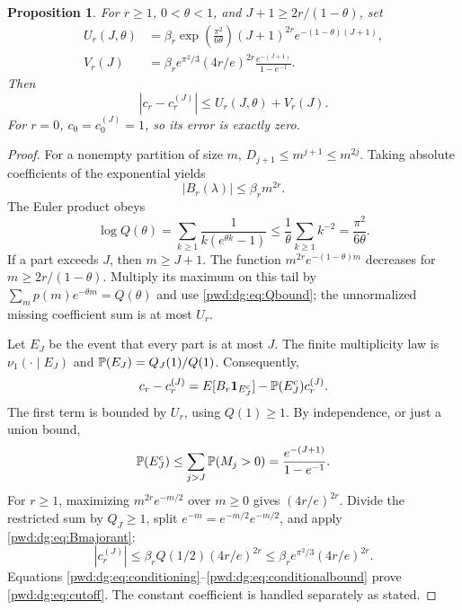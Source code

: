 \documentclass[11pt,letterpaper]{article}
\numberwithin{equation}{section}
\newtheorem{proposition}[theorem]{Proposition}
\theoremstyle{remark}\newtheorem{remark}[theorem]{Remark}
\newcommand{\ind}{\mathbf 1}
\begin{document}
\begin{proposition}\label{pwd:dg:prop:cutoff}
For $r\ge1$, $0<\theta<1$, and $J+1\ge2r/(1-\theta)$, set
\begin{align}
 U_r(J,\theta)&=\beta_r\exp\left(\frac{\pi^2}{6\theta}\right)
 (J+1)^{2r}e^{-(1-\theta)(J+1)},\label{pwd:dg:eq:U}\\
 V_r(J)&=\beta_r e^{\pi^2/3}(4r/e)^{2r}
             \frac{e^{-(J+1)}}{1-e^{-1}}.\label{pwd:dg:eq:V}
\end{align}
Then
\begin{equation}\label{pwd:dg:eq:cutoff}
 |c_r-c_r^{(J)}|\le U_r(J,\theta)+V_r(J).
\end{equation}
For $r=0$, $c_0=c_0^{(J)}=1$, so its error is exactly zero.
\end{proposition}
\begin{proof}
For a nonempty partition of size $m$, $D_{j+1}\le m^{j+1}\le m^{2j}$. Taking absolute coefficients of the exponential yields
\begin{equation}\label{pwd:dg:eq:Bmajorant}
 |B_r(\lambda)|\le\beta_rm^{2r}.
\end{equation}
The Euler product obeys
\begin{equation}\label{pwd:dg:eq:Qbound}
 \log Q(\theta)=\sum_{k\ge1}\frac1{k(e^{\theta k}-1)}
 \le\frac1\theta\sum_{k\ge1}k^{-2}=\frac{\pi^2}{6\theta}.
\end{equation}
If a part exceeds $J$, then $m\ge J+1$. The function $m^{2r}e^{-(1-\theta)m}$ decreases for $m\ge2r/(1-\theta)$. Multiply its maximum on this tail by $\sum_mp(m)e^{-\theta m}=Q(\theta)$ and use \eqref{pwd:dg:eq:Qbound}; the unnormalized missing coefficient sum is at most $U_r$.

Let $E_J$ be the event that every part is at most $J$. The finite multiplicity law is $\nu_1(\cdot\mid E_J)$ and $\mathbb P(E_J)=Q_J(1)/Q(1)$. Consequently,
\begin{equation}\label{pwd:dg:eq:conditioning}
 c_r-c_r^{(J)}=E[B_r\ind_{E_J^c}]-\Prob(E_J^c)c_r^{(J)}.
\end{equation}
The first term is bounded by $U_r$, using $Q(1)\ge1$. By independence, or just a union bound,
\begin{equation}\label{pwd:dg:eq:probmissing}
 \mathbb P(E_J^c)\le\sum_{j>J}\mathbb P(M_j>0)
 =\frac{e^{-(J+1)}}{1-e^{-1}}.
\end{equation}
For $r\ge1$, maximizing $m^{2r}e^{-m/2}$ over $m\ge0$ gives $(4r/e)^{2r}$. Divide the restricted sum by $Q_J\ge1$, split $e^{-m}=e^{-m/2}e^{-m/2}$, and apply \eqref{pwd:dg:eq:Bmajorant}:
\begin{equation}\label{pwd:dg:eq:conditionalbound}
 |c_r^{(J)}|\le\beta_rQ(1/2)(4r/e)^{2r}
 \le\beta_re^{\pi^2/3}(4r/e)^{2r}.
\end{equation}
Equations \eqref{pwd:dg:eq:conditioning}--\eqref{pwd:dg:eq:conditionalbound} prove \eqref{pwd:dg:eq:cutoff}. The constant coefficient is handled separately as stated.
\end{proof}
\end{document}
